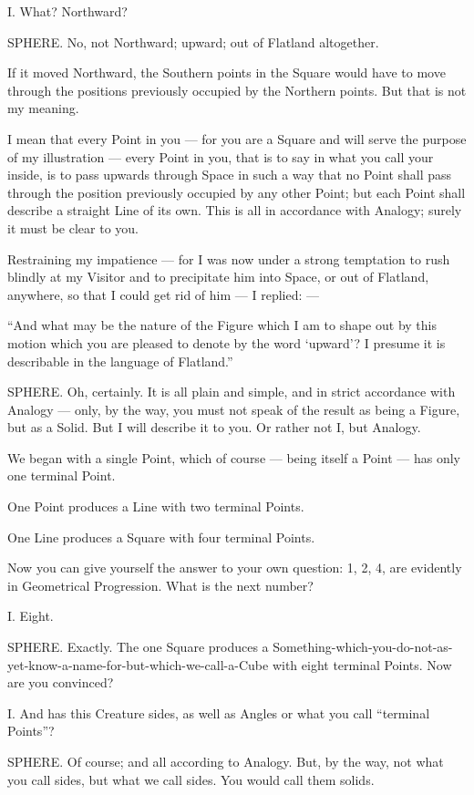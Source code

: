 \documentclass[12pt, a4paper, oneside]{memoir}
\begin{document}
I. What? Northward?

SPHERE. No, not Northward; upward; out of Flatland altogether.

If it moved Northward, the Southern points in the Square would have to move
through the positions previously occupied by the Northern points. But that is
not my meaning.

I mean that every Point in you --- for you are a Square and will serve the
purpose of my illustration --- every Point in you, that is to say in what you
call your inside, is to pass upwards through Space in such a way that no Point
shall pass through the position previously occupied by any other Point; but
each Point shall describe a straight Line of its own. This is all in
accordance with Analogy; surely it must be clear to you.

Restraining my impatience --- for I was now under a strong temptation to rush
blindly at my Visitor and to precipitate him into Space, or out of Flatland,
anywhere, so that I could get rid of him --- I replied: ---

``And what may be the nature of the Figure which I am to shape out by this
motion which you are pleased to denote by the word `upward'? I presume it is
describable in the language of Flatland.''

SPHERE. Oh, certainly. It is all plain and simple, and in strict accordance
with Analogy --- only, by the way, you must not speak of the result as being a
Figure, but as a Solid. But I will describe it to you. Or rather not I, but
Analogy.

We began with a single Point, which of course --- being itself a Point --- has
only one terminal Point.

One Point produces a Line with two terminal Points.

One Line produces a Square with four terminal Points.

Now you can give yourself the answer to your own question: 1, 2, 4, are
evidently in Geometrical Progression. What is the next number?

I. Eight.

SPHERE. Exactly. The one Square produces a
Something-which-you-do-not-as-yet-know-a-name-for-but-which-we-call-a-Cube
with eight terminal Points. Now are you convinced?

I. And has this Creature sides, as well as Angles or what you call ``terminal
Points''?

SPHERE. Of course; and all according to Analogy. But, by the way, not what you
call sides, but what we call sides. You would call them solids.
\end{document}
